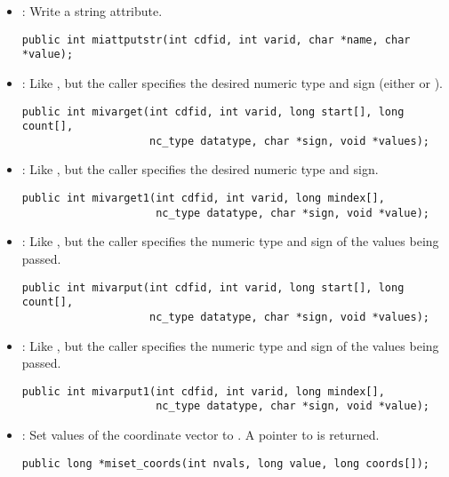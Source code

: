 \documentclass{article}
\begin{document}
\begin{itemize}
\item {} : Write a string attribute.
\begin{verbatim}
public int miattputstr(int cdfid, int varid, char *name, char *value);
\end{verbatim}

\item {} : Like , but the caller specifies
the desired numeric type and sign (either  or
).
\begin{verbatim}
public int mivarget(int cdfid, int varid, long start[], long count[],
                    nc_type datatype, char *sign, void *values);
\end{verbatim}

\item {} : Like , but the caller
specifies the desired numeric type and sign.
\begin{verbatim}
public int mivarget1(int cdfid, int varid, long mindex[],
                     nc_type datatype, char *sign, void *value);
\end{verbatim}

\item {} : Like , but the caller specifies
the numeric type and sign of the values being passed.
\begin{verbatim}
public int mivarput(int cdfid, int varid, long start[], long count[],
                    nc_type datatype, char *sign, void *values);
\end{verbatim}

\item {} : Like , but the caller specifies
the numeric type and sign of the values being passed.
\begin{verbatim}
public int mivarput1(int cdfid, int varid, long mindex[],
                     nc_type datatype, char *sign, void *value);
\end{verbatim}

\item {} : Set  values of the coordinate
vector  to . A pointer to  is
returned.
\begin{verbatim}
public long *miset_coords(int nvals, long value, long coords[]);
\end{verbatim}


\end{itemize}
\end{document}
